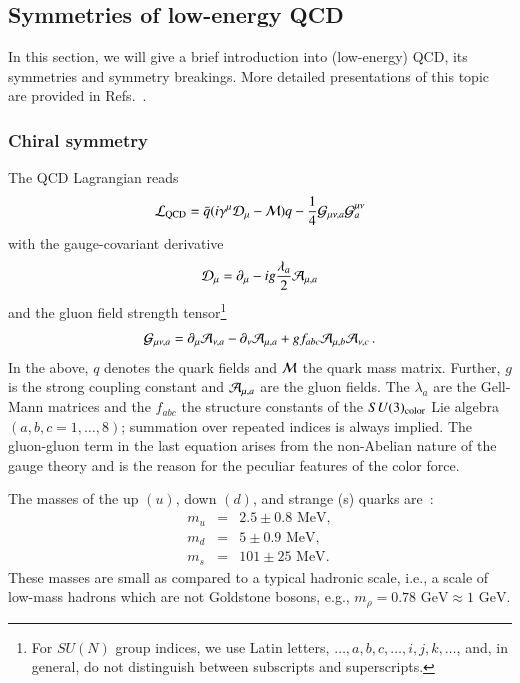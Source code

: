 \documentclass[sort&compress,preprint,3p]{elsarticle}
\begin{document}
\subsection{Symmetries of low-energy QCD}

In this section, we will give a brief introduction into 
(low-energy) QCD,
its symmetries and symmetry breakings.
More detailed presentations of this topic are provided
in Refs.~\cite{Wei05,Sch03,SS05}.


\subsubsection{Chiral symmetry}

The QCD Lagrangian reads
\begin{equation}
{\cal L}_{\rm QCD} = 
\bar{q} (i \gamma^\mu {\cal D}_\mu - {\cal M})q
 - \frac14 
{\cal G}_{\mu\nu,a}
{\cal G}^{\mu\nu}_{a} 
\label{eq_LQCD}
\end{equation}
with the gauge-covariant derivative
\begin{equation}
{\cal D}_\mu = \partial_\mu -ig\frac{\lambda_a}{2}
{\cal A}_{\mu,a}
\end{equation}
and the gluon field strength tensor\footnote{For $SU(N)$ group indices, we use 
Latin letters, $\ldots,a,b,c,\ldots,i,j,k,\dots$,
and, in general, do not distinguish between subscripts and superscripts.}
\begin{equation}
{\cal G}_{\mu\nu,a} =
\partial_\mu {\cal A}_{\nu,a}
-\partial_\nu {\cal A}_{\mu,a}
 + g f_{abc}
{\cal A}_{\mu,b}
{\cal A}_{\nu,c} \,.
\end{equation}
In the above, $q$ denotes the quark fields and ${\cal M}$
the quark mass matrix. Further, $g$ is the
strong coupling constant and ${\cal A}_{\mu,a}$
are the gluon fields. The $\lambda_a$ are the
Gell-Mann matrices and the $f_{abc}$
the structure constants of the $SU(3)_{\rm color}$
Lie algebra $(a,b,c=1,\dots ,8)$;
summation over repeated indices is always implied.
The gluon-gluon term in the last equation arises
from the non-Abelian nature of the gauge theory
and is the reason for the peculiar features
of the color force.

The masses of the up $(u)$, down $(d)$, and
strange (s) quarks are~\cite{PDG}:
\begin{eqnarray}
m_u &=& 2.5\pm 0.8 \mbox{ MeV} ,
\label{eq_umass} \\
m_d &=& 5\pm 0.9 \mbox{ MeV} ,
\label{eq_dmass} \\
m_s &=& 101\pm 25 \mbox{ MeV} .
\label{eq_smass}
\end{eqnarray}
These masses are small as compared to
a typical hadronic scale, i.e., a scale of low-mass
hadrons which are not Goldstone bosons, e.g., 
$m_\rho=0.78 \mbox{ GeV} \approx 1 \mbox{ GeV}$.
\end{document}
